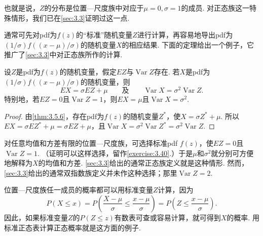 也就是说，$Z$的分布是位置—尺度族中对应于$\mu=0,\sigma=1$的成员. 对正态族这一特殊情形，我们已在\autoref{sec:3.3}证明过这一点.

通常可先对pdf为$f(z)$的“标准”随机变量$Z$进行计算，再容易地导出pdf为$(1/\sigma)f((x-\mu)/\sigma)$的随机变量$X$的相应结果. 下面的定理给出一个例子，它推广了\autoref{sec:3.3}中对正态族所作的计算.

\begin{theorem}\label{thm:3.5.7}
设$Z$是pdf为$f(z)$的随机变量，假定$EZ$与$\operatorname{Var}Z$存在. 若$X$是pdf为$(1/\sigma)f((x-\mu)/\sigma)$的随机变量，则
$$EX=\sigma EZ+\mu\qquad\text{及}\qquad\operatorname{Var}X=\sigma^2\operatorname{Var}Z.$$
特别地，若$EZ=0$且$\operatorname{Var}Z=1$，则$EX=\mu$且$\operatorname{Var}X=\sigma^2$.
\end{theorem}
\begin{proof}
由\autoref{thm:3.5.6}，存在pdf为$f(z)$的随机变量$Z^*$，使$X=\sigma Z^*+\mu$. 所以$EX=\sigma EZ^*+\mu=\sigma EZ+\mu$，且$\operatorname{Var}X=\sigma^2\operatorname{Var}Z^*=\sigma^2\operatorname{Var}Z$.
\end{proof}
对任意均值和方差有限的位置—尺度族，可选择标准pdf $f(z)$，使$EZ=0$且$\operatorname{Var}Z=1$. （证明可以这样选择，留作\autoref{exercise:3.40}.）于是$\mu$和$\sigma^2$就分别可方便地解释为$X$的均值和方差. \autoref{sec:3.3}给出的通常正态族定义就是这种情形. 然而，\autoref{sec:3.3}给出的通常双指数族定义并未作这种选择；那里$\operatorname{Var}Z=2$.

位置—尺度族任一成员的概率都可以用标准变量$Z$计算，因为
$$P(X\le x)=P\left(\frac{X-\mu}\sigma\le\frac{x-\mu}\sigma\right)=P\left(Z\le\frac{x-\mu}\sigma\right).$$
因此，如果标准变量$Z$的$P(Z\le z)$有数表可查或容易计算，就可得到$X$的概率. 用标准正态表计算正态概率就是这方面的例子.
